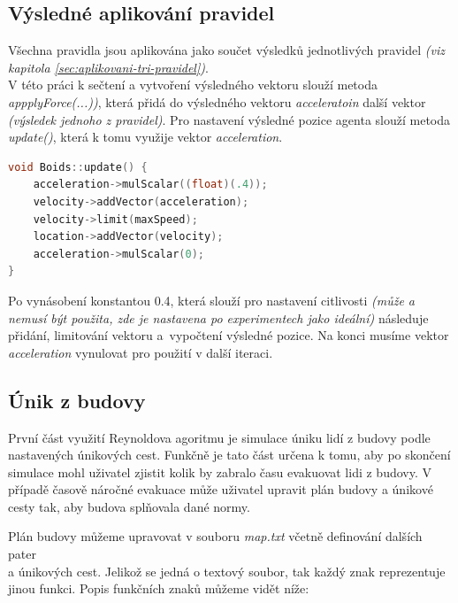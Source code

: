 \documentclass[czech,public,dept460,male,cpdeclaration]{diploma}
\begin{document}
\subsection{Výsledné aplikování pravidel}
Všechna pravidla jsou aplikována jako součet výsledků jednotlivých pravidel \textit{(viz kapitola \ref{sec:aplikovani-tri-pravidel})}. \\V této práci k sečtení a vytvoření výsledného vektoru slouží metoda \textit{appplyForce(...))}, která přidá do výsledného vektoru \textit{acceleratoin} další vektor \textit{(výsledek jednoho z pravidel)}. Pro nastavení výsledné pozice agenta slouží metoda \textit{update()}, která k tomu využije vektor \textit{acceleration}.

\begin{lstlisting}[language=c++,label=src:seek,caption=Nastavení výsledné pozice agenta] 
void Boids::update() {
	acceleration->mulScalar((float)(.4));
	velocity->addVector(acceleration);
	velocity->limit(maxSpeed);
	location->addVector(velocity);
	acceleration->mulScalar(0);
}
\end{lstlisting}

Po vynásobení konstantou 0.4, která slouží pro nastavení citlivosti \textit{(může a nemusí být použita, zde je nastavena po experimentech jako ideální)} následuje přidání, limitování vektoru a~vypočtení výsledné pozice. Na konci musíme vektor \textit{acceleration} vynulovat pro použití v další iteraci.

\subsection{Únik z budovy}
První část využití Reynoldova agoritmu je simulace úniku lidí z budovy podle nastavených únikových cest. Funkčně je tato část určena k tomu, aby po skončení simulace mohl uživatel zjistit kolik by zabralo času evakuovat lidi z budovy. V případě časově náročné evakuace může uživatel upravit plán budovy a únikové cesty tak, aby budova splňovala dané normy.

Plán budovy můžeme upravovat v souboru \textit{map.txt} včetně definování dalších pater\\ a únikových cest. Jelikož se jedná o textový soubor, tak každý znak reprezentuje jinou funkci. Popis funkčních znaků můžeme vidět níže:
\end{document}
